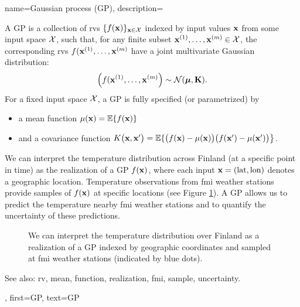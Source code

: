 {name={Gaussian process (GP)},
  description={A GP is a collection of \glspl{rv} 
  	$\{f({\bf x})\}_{{\bf x} \in \mathcal{X}}$ indexed by input values ${\bf x}$ 
  	from some input space $\mathcal{X}$, such that, for any finite subset 
  	${\bf x}^{(1)}, \ldots, {\bf x}^{(m)} \in \mathcal{X}$, 
  	the corresponding \glspl{rv} $f({\bf x}^{(1)}, \ldots, {\bf x}^{(m)}$ have a joint 
  	multivariate Gaussian distribution:
  	\[
  	\left( f({\bf x}^{(1)}, \ldots, {\bf x}^{(m)} \right) \sim \mathcal{N}(\boldsymbol{\mu}, \mathbf{K}).
  	\]
  	For a fixed input space $\mathcal{X}$, a GP is fully specified (or parametrized) by 
  	\begin{itemize}
  		\item a \gls{mean} \gls{function} $\mu({\bf x}) = \mathbb{E}\{ f({\bf x})\}$
  		\item and a covariance \gls{function} $K\big({\bf x},{\bf x}'\big)= \mathbb{E}\{ \big(f({\bf x})-\mu({\bf x})\big) \big(f({\bf x}')-\mu({\bf x}')\big) \big\}$.
  	\end{itemize}
  	 We can interpret the temperature distribution across Finland (at a specific 
  	point in time) as the \gls{realization} of a GP $f({\bf x})$, where each input ${\bf x} = (\text{lat}, \text{lon})$ 
  	denotes a geographic location. Temperature observations from \gls{fmi} weather stations provide 
  	\glspl{sample} of $f({\bf x})$ at specific locations (see Figure \ref{fig_gp_FMI_dict}). A GP allows us to 
  	predict the temperature nearby \gls{fmi} weather stations and to quantify the \gls{uncertainty} 
  	of these predictions. 
  	\begin{figure}[H]
  	\begin{center}
\vspace*{-15mm}
\end{center}
\caption{We can interpret the temperature distribution over Finland as a \gls{realization} 
	of a GP indexed by geographic coordinates and sampled at \gls{fmi} weather stations (indicated by 
	blue dots). \label{fig_gp_FMI_dict}}
\end{figure}
See also: \gls{rv}, \gls{mean}, \gls{function}, \gls{realization}, \gls{fmi}, \gls{sample}, \gls{uncertainty}.}, 
first={GP}, 
text={GP}
}

